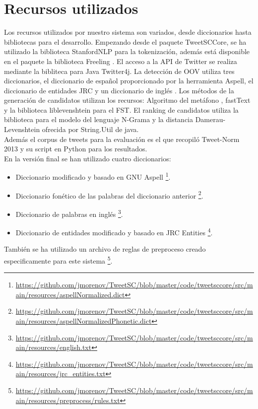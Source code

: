 \documentclass[spanish,12pt, a4paper,twoside]{paper}
\let\oldsection\section
\def\section{\cleardoublepage\oldsection}
\begin{document}
\section{Recursos utilizados}\label{sec:recursosutilizados}
Los recursos utilizados por nuestro sistema son variados, desde diccionarios hasta bibliotecas para el desarrollo. Empezando desde el paquete TweetSCCore, se ha utilizado la biblioteca StanfordNLP \cite{stanfordnlp} para la tokenización, además está disponible en el paquete la biblioteca Freeling \cite{freeling}. El acceso a la API de Twitter se realiza mediante la bibliteca para Java Twitter4j. La detección de OOV utiliza tres diccionarios, el diccionario de español proporcionado por la herramienta Aspell, el diccionario de entidades JRC y un diccionario de inglés \cite{englishdictionary}. Los métodos de la generación de candidatos utilizan los recursos: Algoritmo del metáfono \cite{mosquera:2011}, fastText \cite{facebook:fasttext} y la biblioteca liblevenshtein \cite{liblevenshtein} para el FST. El ranking de candidatos utiliza la biblioteca \cite{opennlp} para el modelo del lenguaje N-Grama y la distancia Damerau-Levenshtein ofrecida por String.Util de java.\\

Además el corpus de tweets para la evaluación es el que recopiló Tweet-Norm 2013 \cite{alegria:2013} y su script en Python para los resultados.\\

En la versión final se han utilizado cuatro diccionarios:
\begin{itemize}
	\item Diccionario modificado y basado en GNU Aspell \footnote{\url{https://github.com/jmorenov/TweetSC/blob/master/code/tweetsccore/src/main/resources/aspellNormalized.dict}}.
	\item Diccionario fonético de las palabras del diccionario anterior \footnote{\url{https://github.com/jmorenov/TweetSC/blob/master/code/tweetsccore/src/main/resources/aspellNormalizedPhonetic.dict}}.
	\item Diccionario de palabras en inglés \footnote{\url{https://github.com/jmorenov/TweetSC/blob/master/code/tweetsccore/src/main/resources/english.txt}}.
	\item Diccionario de entidades modificado y basado en JRC Entities \footnote{\url{https://github.com/jmorenov/TweetSC/blob/master/code/tweetsccore/src/main/resources/jrc_entities.txt}}.
\end{itemize}

También se ha utilizado un archivo de reglas de preproceso creado especificamente para este sistema \footnote{\url{https://github.com/jmorenov/TweetSC/blob/master/code/tweetsccore/src/main/resources/preprocess/rules.txt}}.\\
\end{document}
